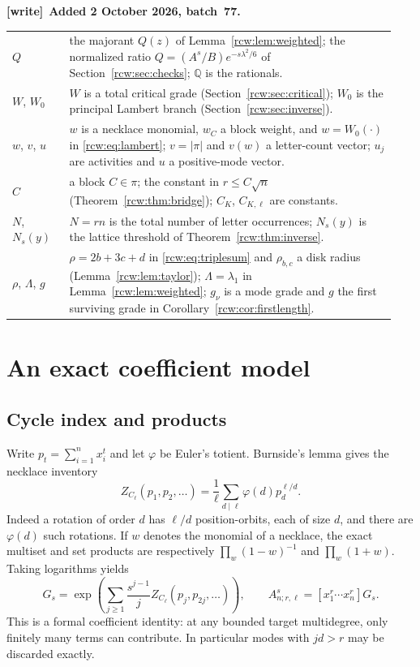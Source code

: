 \documentclass[11pt]{article}
\theoremstyle{definition}\newtheorem{definition}[theorem]{Definition}
\theoremstyle{remark}\newtheorem{remark}[theorem]{Remark}
\newcommand{\A}{A^s_{n;r,\ell}}
\newcommand{\Q}{\mathbb Q}
\newenvironment{writenote}[1][]{\par\smallskip\begingroup\small
 \noindent\textbf{[write]}\if\relax\detokenize{#1}\relax\else~\textbf{#1.}\fi\ }%
 {\par\endgroup\smallskip}
\numberwithin{equation}{section}
\begin{document}
\begin{writenote}[Added 2 October 2026, batch~77]
\begin{center}
\begin{tabular}{@{}p{0.14\linewidth}p{0.80\linewidth}@{}}
$Q$ & the majorant $Q(z)$ of Lemma~\ref{rcw:lem:weighted}; the normalized ratio $Q=(A^s/B)e^{-s\lambda^2/6}$ of Section~\ref{rcw:sec:checks}; $\Q$ is the rationals.\\
$W$, $W_0$ & $W$ is a total critical grade (Section~\ref{rcw:sec:critical}); $W_0$ is the principal Lambert branch (Section~\ref{rcw:sec:inverse}).\\
$w$, $v$, $u$ & $w$ is a necklace monomial, $w_C$ a block weight, and $w=W_0(\cdot)$ in \eqref{rcw:eq:lambert}; $v=|\pi|$ and $v(w)$ a letter-count vector; $u_j$ are activities and $u$ a positive-mode vector.\\
$C$ & a block $C\in\pi$; the constant in $r\le C\sqrt n$ (Theorem~\ref{rcw:thm:bridge}); $C_K$, $C_{K,\ell}$ are constants.\\
$N$, $N_s(y)$ & $N=rn$ is the total number of letter occurrences; $N_s(y)$ is the lattice threshold of Theorem~\ref{rcw:thm:inverse}.\\
$\rho$, $\Lambda$, $g$ & $\rho=2b+3c+d$ in \eqref{rcw:eq:triplesum} and $\rho_{b,c}$ a disk radius (Lemma~\ref{rcw:lem:taylor}); $\Lambda=\lambda_1$ in Lemma~\ref{rcw:lem:weighted}; $g_\nu$ is a mode grade and $g$ the first surviving grade in Corollary~\ref{rcw:cor:firstlength}.\\
\bottomrule
\end{tabular}
\end{center}
\end{writenote}

\section{An exact coefficient model}\label{rcw:sec:model}
\subsection{Cycle index and products}
Write $p_t=\sum_{i=1}^n x_i^t$ and let $\varphi$ be Euler's totient. Burnside's lemma gives the necklace inventory
\begin{equation}\label{rcw:eq:inventory}
 Z_{C_\ell}(p_1,p_2,\ldots)
 =\frac1\ell\sum_{d\mid\ell}\varphi(d)p_d^{\ell/d}.
\end{equation}
Indeed a rotation of order $d$ has $\ell/d$ position-orbits, each of size $d$, and there are $\varphi(d)$ such rotations. If $w$ denotes the monomial of a necklace, the exact multiset and set products are respectively $\prod_w(1-w)^{-1}$ and $\prod_w(1+w)$. Taking logarithms yields
\begin{equation}\label{rcw:eq:G}
 G_s=\exp\!\left(\sum_{j\ge1}\frac{s^{j-1}}j
 Z_{C_\ell}(p_j,p_{2j},\ldots)\right),\qquad
 \A=[x_1^r\cdots x_n^r]G_s.
\end{equation}
This is a formal coefficient identity: at any bounded target multidegree, only finitely many terms can contribute. In particular modes with $jd>r$ may be discarded exactly.
\end{document}
